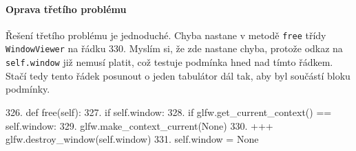 \paragraph{Oprava třetího problému}
Řešení třetího problému je jednoduché. Chyba nastane v metodě
\texttt{free} třídy \texttt{WindowViewer} na řádku 330. Myslím si, že zde
nastane chyba, protože odkaz na \texttt{self.window} již nemusí platit, což
testuje podmínka hned nad tímto řádkem. Stačí tedy tento řádek posunout o jeden
tabulátor dál tak, aby byl součástí bloku podmínky.

\begin{code}
326.  def free(self):
327.      if self.window:
328.          if glfw.get_current_context() == self.window:
329.              glfw.make_context_current(None)
330.      +++ glfw.destroy_window(self.window)
331.      self.window = None
\end{code}


